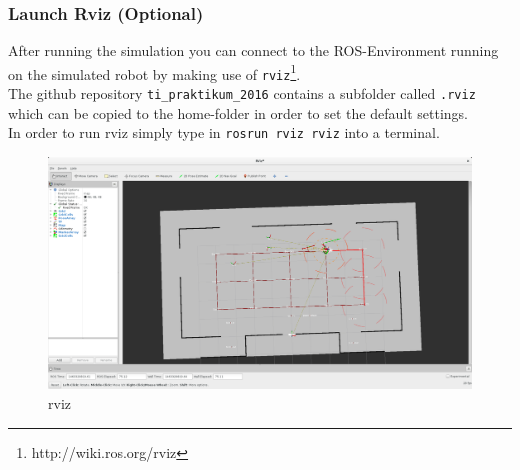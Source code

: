 \documentclass[oribibl]{llncs}
\begin{document}
\subsubsection{Launch Rviz (Optional)}
After running the simulation you can connect to the ROS-Environment running on the simulated robot by making use of \texttt{rviz}\footnote{http://wiki.ros.org/rviz}.\\
The github repository \texttt{ti\_praktikum\_2016} contains a subfolder called \texttt{.rviz} which can be copied to the home-folder in order to set the default settings.\\
In order to run rviz simply type in \texttt{rosrun rviz rviz} into a terminal.
\begin{figure}
        \centering
        \includegraphics[width=\textwidth]{images/rviz.png}
        \caption{rviz}
        \label{rviz}
\end{figure}
\end{document}
